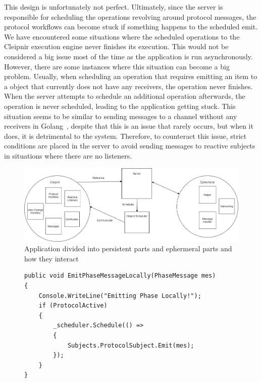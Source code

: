This design is unfortunately not perfect. Ultimately, since the server is responsible for scheduling the operations revolving around protocol messages, the protocol workflows can become stuck if something happens to the scheduled emit. We have encountered some situations where the scheduled operations to the Cleipnir execution engine never finishes its execution. This would not be considered a big issue most of the time as the application is run asynchronously. However, there are some instances where this situation can become a big problem. Usually, when scheduling an operation that requires emitting an item to a  object that currently does not have any receivers, the operation never finishes. When the server attempts to schedule an additional operation afterwards, the operation is never scheduled, leading to the application getting stuck. This situation seems to be similar to sending messages to a channel without any receivers in Golang~\cite{WEB:golangChannels}, despite that this is an issue that rarely occurs, but when it does, it is detrimental to the system. Therefore, to counteract this issue, strict conditions are placed in the server to avoid sending messages to reactive subjects in situations where there are no listeners.

\begin{figure}[H]
	\includegraphics[width=\linewidth]{figures/CleipnirStructure}
	\caption{Application divided into persistent parts and ephermeral parts and how they interact}
	\label{fig:PersistencyEphemeral}
\end{figure}

\begin{figure}[h]
	\centering
	\begin{lstlisting}[label = code:schedulerEmit, caption= Example of server and protocol interaction using Cleipnir scheduler, captionpos=b, basicstyle=\scriptsize]
public void EmitPhaseMessageLocally(PhaseMessage mes)
{
    Console.WriteLine("Emitting Phase Locally!");
    if (ProtocolActive)
    {
        _scheduler.Schedule(() =>
        {
            Subjects.ProtocolSubject.Emit(mes);
        });   
    }
}
	\end{lstlisting}
\end{figure}
